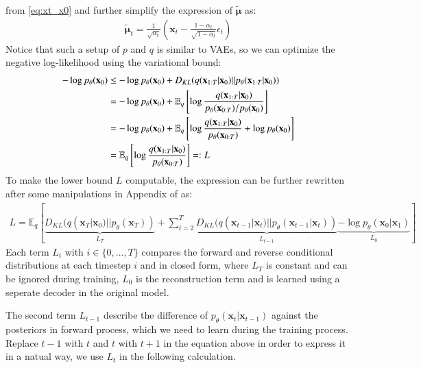 \documentclass[12pt,DIV14,BCOR12mm,a4paper,footinclude=false,headinclude,parskip=half-,twoside,openright,cleardoublepage=empty,toc=index,bibliography=totoc,listof=totoc]{scrreprt}
\numberwithin{equation}{chapter}
\begin{document}
from \ref{eq:xt_x0} and further simplify the expression of $\boldsymbol{\tilde{\mu}}$ as:
\begin{align}\label{eq:mu_tilde}
  \boldsymbol{\tilde{\mu}}_{t} = \frac{1}{\sqrt{\alpha_{t}}}\left(\mathbf{x}_{t} - \frac{1-\alpha_{t}}{\sqrt{1-\bar{\alpha}_{t}}}\epsilon_{t}\right)
\end{align}
Notice that such a setup of $p$ and $q$ is similar to VAEs, so we can optimize the negative log-likelihood using the variational bound:
\begin{align}
  -\log p_{\theta}(\mathbf{x}_{0}) &\leq -\log p_{\theta}(\mathbf{x}_{0}) + D_{KL}(q(\mathbf{x}_{1:T}|\mathbf{x}_{0})||p_{\theta}(\mathbf{x}_{1:T}|\mathbf{x}_{0}))\notag\\
                                   &= -\log p_{\theta}(\mathbf{x}_{0}) + \mathbb{E}_{q}\left[\log\frac{q(\mathbf{x}_{1:T}|\mathbf{x}_{0})}{p_{\theta}(\mathbf{x}_{0:T})/p_{\theta}(\mathbf{x}_{0})}\right]\notag\\       
                                   &= -\log p_{\theta}(\mathbf{x}_{0}) + \mathbb{E}_{q}\left[\log\frac{q(\mathbf{x}_{1:T}|\mathbf{x}_{0})}{p_{\theta}(\mathbf{x}_{0:T})} + \log p_{\theta}(\mathbf{x}_{0})\right]\notag\\
                                   &= \mathbb{E}_{q}\left[\log\frac{q(\mathbf{x}_{1:T}|\mathbf{x}_{0})}{p_{\theta}(\mathbf{x}_{0:T})}\right] =: L             
\end{align}
To make the lower bound $L$ computable, the expression can be further rewritten after some manipulations in Appendix of \cite{ho2020denoising} as:
\begin{align}
  L = \mathbb{E}_{q}\left[\underbrace{D_{KL}(q(\mathbf{x}_{T}|\mathbf{x}_{0})||p_{\theta}(\mathbf{x}_{T}))}_{L_{T}} + \sum_{t=2}^{T}\underbrace{D_{KL}(q(\mathbf{x}_{t-1}|\mathbf{x}_{t})||p_{\theta}(\mathbf{x}_{t-1}|\mathbf{x}_{t}))}_{L_{t-1}} \underbrace{- \log p_{\theta}(\mathbf{x}_{0}|\mathbf{x}_{1})}_{L_{0}}\right]
\end{align}
Each term $L_{i}$ with $i\in \{0,...,T\}$ compares the forward and reverse conditional distributions at each timestep $i$ and in closed form, where $L_{T}$ is constant and can be ignored during training, $L_{0}$ is the reconstruction term and is learned using a seperate decoder in the original model\cite{weng2021diffusion}.

The second term $L_{t-1}$ describe the difference of $p_{\theta}(\mathbf{x}_{t}|\mathbf{x}_{t-1})$ against the posteriors in forward process, which we need to learn during the training process. Replace $t-1$ with $t$ and $t$ with $t+1$ in the equation above in order to express it in a natual way, we use $L_{t}$ in the following calculation.
\end{document}

